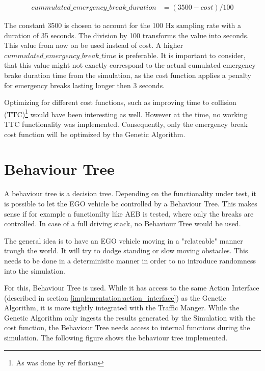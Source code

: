 \begin{equation} 
	\label{equ:modified_cost}
	\begin{split}
		cummulated\_emergency\_break\_duration & = (3500 - cost) / 100
	\end{split}
\end{equation}

The constant 3500 is chosen to account for the 100 Hz sampling rate with a duration of 35 seconds. The division by 100 transforms the value into seconds. This value from now on be used instead of cost. A higher $cummulated\_emergency\_break\_time$ is preferable. It is important to consider, that this value might not exactly correspond to the actual cumulated emergency brake duration time from the simulation, as the cost function applies a penalty for emergency breaks lasting longer then 3 seconds.

Optimizing for different cost functions, such as improving time to collision (TTC)\footnote{As was done by ref florian} would have been interesting as well. However at the time, no working TTC functionality was implemented. Consequently, only the emergency break cost function will be optimized by the Genetic Algorithm.

\section{Behaviour Tree}
A behaviour tree is a decision tree. 
Depending on the functionality under test, it is possible to let the EGO vehicle be controlled by a Behaviour Tree. This makes sense if for example a functionilty like AEB is tested, where only the breaks are controlled. In case of a full driving stack, no Behaviour Tree would be used.

The general idea is to have an EGO vehicle moving in a "relateable" manner trough the world. It will try to dodge standing or slow moving obstacles. This needs to be done in a determinisitc manner in order to no introduce randomness into the simulation.

For this, Behaviour Tree is used. While it has access to the same Action Interface (described in section \ref{implementation:action_interface}) as the Genetic Algorithm, it is more tightly integrated with the Traffic Manger. While the Genetic Algorithm only ingests the results generated by the Simulation with the cost function, the Behaviour Tree needs access to internal functions during the simulation. The following figure shows the behaviour tree implemented.




